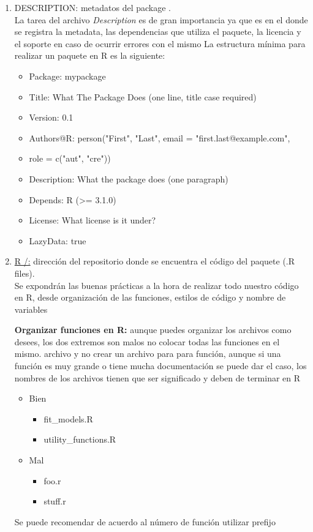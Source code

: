 \begin{enumerate}
  \item  DESCRIPTION: metadatos del package .\\
La tarea del archivo \textit{Description} es de gran importancia ya que es en el donde se registra la metadata, las dependencias que utiliza el paquete, la licencia y el soporte en caso de ocurrir errores con el mismo
La estructura mínima para realizar un paquete en R es la siguiente:

\begin{itemize}
\item Package: mypackage
\item Title: What The Package Does (one line, title case required)
\item Version: 0.1
\item Authors@R: person("First", "Last", email = "first.last@example.com",
\item role = c("aut", "cre"))
\item Description: What the package does (one paragraph)
\item Depends: R (>= 3.1.0)
\item License: What license is it under?
\item LazyData: true
\end{itemize}
  \item \url{R /:} dirección del repositorio donde se encuentra el código del paquete (.R files).\\
Se expondrán las buenas prácticas a la hora de realizar todo nuestro código en R, desde organización de las funciones, estilos de código y nombre de variables 

\textbf{Organizar funciones en R:} aunque puedes organizar los archivos como desees, los dos extremos son malos no colocar todas las funciones en el mismo. archivo y no crear un archivo para para función, aunque si una función es muy grande o tiene mucha documentación se puede dar el caso, los nombres de los archivos tienen que ser significado y deben de terminar en R
\begin{itemize}
\item Bien  
\begin{itemize}
     \item fit\_models.R
     \item utility\_functions.R
  \end{itemize}
\item Mal
   \begin{itemize}
      \item foo.r
      \item stuff.r
    \end{itemize}
 \end{itemize}
Se puede recomendar de acuerdo al número de función utilizar prefijo 


\end{enumerate}
